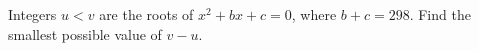 Integers $u<v$ are the roots of $x^2+bx+c=0$, where $b+c=298$. Find the smallest possible value of $v-u$.
